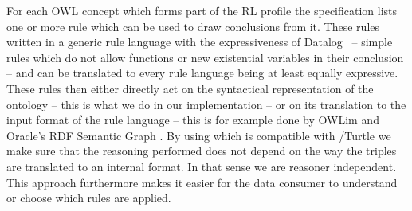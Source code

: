 For each OWL concept which forms part of the RL profile the specification lists one or more rule %
which can be used to draw conclusions from it. These rules written in a generic \rdf rule language with the expressiveness of Datalog~\cite{datalog} -- \ie simple rules which do not allow functions 
or new existential variables in their conclusion
-- and can be translated to 
every rule language being at least equally expressive. 
These rules then either directly act on the syntactical representation of the ontology -- this is what we do in our implementation -- 
or on its translation to the input format of the rule language -- this is for example done by OWLim \cite{owlim} and Oracle's RDF Semantic Graph \cite{oracle}.
By using \nthree which is compatible with \rdf/Turtle we make sure that the reasoning performed does not depend on the way the triples are translated to an internal format. 
In that sense we are reasoner independent. This approach furthermore makes it easier for the data consumer to understand or choose which rules are applied.  
% 
 
